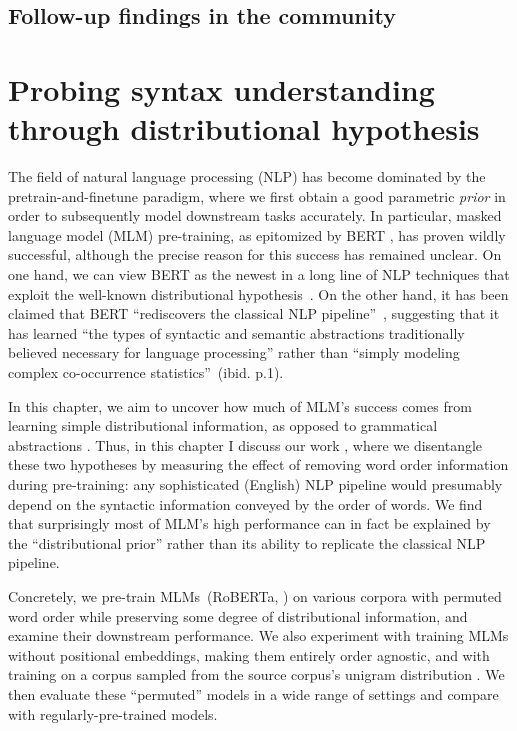 \documentclass[letterpaper, 12pt]{report}
\begin{document}
\section{Follow-up findings in the community}
\label{sec:unli_followup}


\clearpage
\chapter{Probing syntax understanding through distributional hypothesis}
\label{sec:mlm}

The field of natural language processing (NLP) has become dominated by the pretrain-and-finetune paradigm, where we first obtain a good parametric \emph{prior} in order to subsequently model downstream tasks accurately.
In particular, masked language model (MLM) pre-training, as epitomized by BERT \citep{devlin-etal-2019-bert}, has proven wildly successful, although the precise reason for this success has remained unclear.
On one hand, we can view BERT as the newest in a long line of NLP techniques  \cite{deerwester1990indexing, landauer1997solution, collobert2008unified, mikolov2013, peters-etal-2018-deep} that exploit the well-known distributional hypothesis~\cite{harris1954distributional}.
On the other hand, it has been claimed that BERT ``rediscovers the classical NLP pipeline''~\cite{tenney-etal-2019-bert}, suggesting that it has learned ``the types of syntactic and semantic abstractions traditionally believed necessary for language processing''
rather than ``simply modeling complex co-occurrence statistics''~(ibid. p.1).

In this chapter, we aim to uncover how much of MLM's success comes from learning simple distributional information, as opposed to grammatical abstractions \citep{tenney-etal-2019-bert,manning2020emergent}. Thus, in this chapter I discuss our work \citep{sinha-etal-2021-masked}, where we disentangle these two hypotheses by measuring the effect of removing word order information during pre-training:
any sophisticated (English) NLP pipeline would presumably depend on the syntactic information conveyed by the order of words.
We find that surprisingly most of MLM's high performance can in fact be explained by the ``distributional prior'' rather than its ability to replicate the classical NLP pipeline.

Concretely, we pre-train MLMs~(RoBERTa, \citealt{liu2019b}) on various corpora with permuted word order while preserving some degree of distributional information, and examine their downstream performance.
We also experiment with training MLMs without positional embeddings, making them entirely order agnostic,
and with training on a corpus sampled from the source corpus's %
unigram distribution%
. We then evaluate these ``permuted'' models in a wide range of settings and compare with regularly-pre-trained models.
\end{document}
